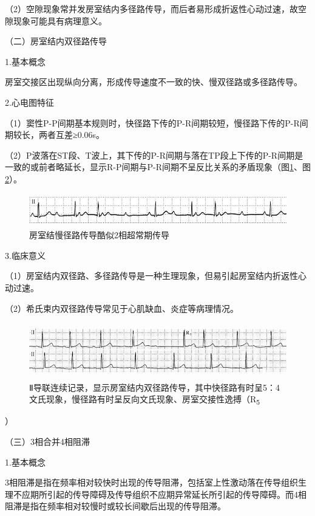 （2）空隙现象常并发房室结内多径路传导，而后者易形成折返性心动过速，故空隙现象可能具有病理意义。

（二）房室结内双径路传导

1.基本概念

房室交接区出现纵向分离，形成传导速度不一致的快、慢双径路或多径路传导。

2.心电图特征

（1）窦性P-P间期基本规则时，快径路下传的P-R间期较短，慢径路下传的P-R间期较长，两者互差≥0.06s。

（2）P波落在ST段、T波上，其下传的P-R间期与落在TP段上下传的P-R间期是一致的或前者略延长，显示R-P间期与P-R间期不呈反比关系的矛盾现象（图\ref{fig28-14}、图\ref{fig28-15}）。

\begin{figure}[!htbp]
 \centering
 \includegraphics[width=5.39583in,height=0.5625in]{./images/Image00475.jpg}
 \captionsetup{justification=centering}
 \caption{房室结慢径路传导酷似2相超常期传导}
 \label{fig28-14}
  \end{figure} 

3.临床意义

（1）房室结内双径路、多径路传导是一种生理现象，但易引起房室结内折返性心动过速。

（2）希氏束内双径路传导常见于心肌缺血、炎症等病理情况。

\begin{figure}[!htbp]
 \centering
 \includegraphics[width=5.58333in,height=0.95833in]{./images/Image00476.jpg}
 \captionsetup{justification=centering}
 \caption{Ⅱ导联连续记录，显示房室结内双径路传导，其中快径路有时呈5：4文氏现象，慢径路有时呈反向文氏现象、房室交接性逸搏（R\textsubscript{5}}
 \label{fig28-15}
  \end{figure} 
）

（三）3相合并4相阻滞

1.基本概念

3相阻滞是指在频率相对较快时出现的传导阻滞，包括室上性激动落在传导组织生理不应期所引起的传导障碍及传导组织不应期异常延长所引起的传导障碍。而4相阻滞是指在频率相对较慢时或较长间歇后出现的传导阻滞。

